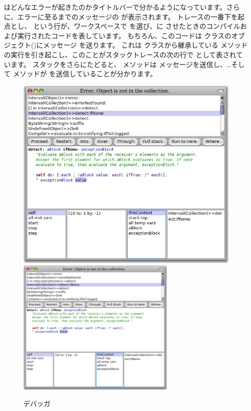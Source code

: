 \documentclass[a4paper,10pt,twoside]{book}
\begin{document}
 はどんなエラーが起きたのかタイトルバーで分かるようになっています。さらに、エラーに至るまでのメッセージの  が表示されます。
トレースの一番下を起点とし、  という行が、ワークスペースで  を選び、\pharo に  させたときのコンパイルおよび実行されたコードを表しています。
もちろん、このコードは  クラスのオブジェクト()にメッセージ  を送ります。
これは  クラスから継承している  メソッドの実行を引き起こし、このことがスタックトレースの次の行で  として表されています。
スタックをさらにたどると、 メソッドは  メッセージを送信し、\ldots そして  メソッドが  を送信していることが分かります。

\begin{figure}[btp]
\begin{center}
\ifluluelse
{\includegraphics[width=\textwidth]{debuggerDetectIfNone}}
{\includegraphics[width=0.7\textwidth]{debuggerDetectIfNone}}
\end{center}
\caption{デバッガ}
\end{figure}
\end{document}
